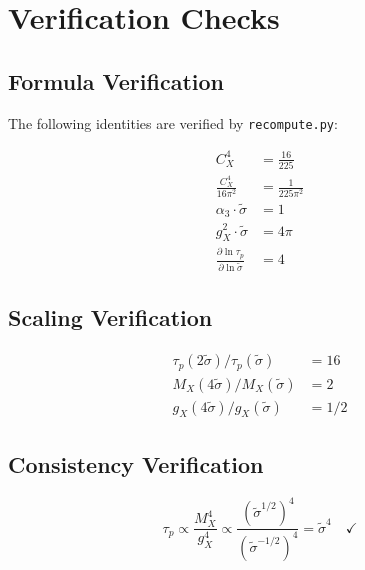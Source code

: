 \documentclass[11pt,letterpaper]{article}
\newcommand{\st}{\tilde{\sigma}}
\begin{document}
\section{Verification Checks}
\label{sec:verification}

\subsection{Formula Verification}
\label{subsec:formula-verification}

The following identities are verified by \texttt{recompute.py}:

\begin{align}
C_X^4 &= \frac{16}{225} \label{eq:verify-cx4} \\
\frac{C_X^4}{16\pi^2} &= \frac{1}{225\pi^2} \label{eq:verify-prefactor} \\
\alpha_3 \cdot \st &= 1 \label{eq:verify-alpha3} \\
g_X^2 \cdot \st &= 4\pi \label{eq:verify-gx} \\
\frac{\partial \ln \tau_p}{\partial \ln \st} &= 4 \label{eq:verify-sensitivity}
\end{align}

\subsection{Scaling Verification}
\label{subsec:scaling-verification}

\begin{align}
\tau_p(2\st) / \tau_p(\st) &= 16 \label{eq:verify-scaling16} \\
M_X(4\st) / M_X(\st) &= 2 \label{eq:verify-mx-scaling} \\
g_X(4\st) / g_X(\st) &= 1/2 \label{eq:verify-gx-scaling}
\end{align}

\subsection{Consistency Verification}
\label{subsec:consistency-verification}

\begin{equation}
\tau_p \propto \frac{M_X^4}{g_X^4} \propto \frac{(\st^{1/2})^4}{(\st^{-1/2})^4} = \st^4 \quad \checkmark
\label{eq:verify-taup-scaling}
\end{equation}

\end{document}
